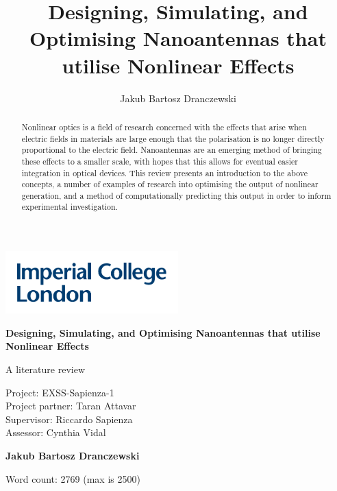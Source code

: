 \documentclass[12pt,a4paper]{article}
\author{Jakub Bartosz Dranczewski}
\title{Designing, Simulating, and Optimising Nanoantennas that utilise Nonlinear Effects}
\date{}
\begin{document}
\begin{titlepage}
	\vspace*{-0.58in}
	\hspace*{-.72in}
	\includegraphics[width=0.5\textwidth]{img/Imperial-logo.pdf}
	\begin{center}
		\vspace*{2cm}
		
		\Huge
		\textbf{Designing, Simulating, and Optimising Nanoantennas that utilise Nonlinear Effects}
		
		\Large
		A literature review
		
		\vspace{1.2cm}
		\large
		Project: EXSS-Sapienza-1\\
		Project partner: Taran Attavar\\
		Supervisor: Riccardo Sapienza\\
		Assessor: Cynthia Vidal
		
		\vspace{1.5cm}
		
		\textbf{Jakub Bartosz Dranczewski}
		
		\vfill
		
		\vspace{0.4cm}
		
		
		Word count: 2769 (max is 2500) %
		
	\end{center}
\end{titlepage}

\begin{abstract}
Nonlinear optics is a field of research concerned with the effects that arise when electric fields in materials are large enough that the polarisation is no longer directly proportional to the electric field. Nanoantennas are an emerging method of bringing these effects to a smaller scale, with hopes that this allows for eventual easier integration in optical devices. This review presents an introduction to the above concepts, a number of examples of research into optimising the output of nonlinear generation, and a method of computationally predicting this output in order to inform experimental investigation.
\end{abstract}
\end{document}
